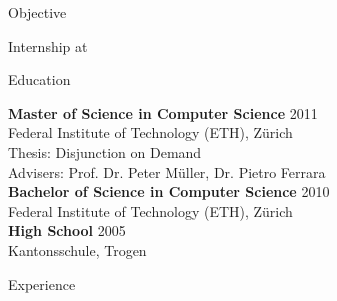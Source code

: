 \documentclass[margin]{res}
\begin{document}
\address{Dominik Gabi\\ Niderenweg 18\\ CH-9043 Trogen\\ +41 79 789 41 24}
\address{\url{https://github.com/dkgi}\\ \url{dkgiwork@gmail.com}}

\begin{resume}


	\begin{section}{Objective}

		Internship at \company

	\end{section}


	\begin{section}{Education}

		\textbf{Master of Science in Computer Science} \hfill 2011\\
		Federal Institute of Technology (ETH), Z\"urich\\
		Thesis: Disjunction on Demand\\
		Advisers: Prof. Dr. Peter M\"uller, Dr. Pietro Ferrara\\[12pt]
		\textbf{Bachelor of Science in Computer Science} \hfill 2010\\
		Federal Institute of Technology (ETH), Z\"urich\\[12pt]
		\textbf{High School} \hfill 2005\\
		Kantonsschule, Trogen

	\end{section}


	\begin{section}{Experience}


\end{section}
\end{resume}
\end{document}
